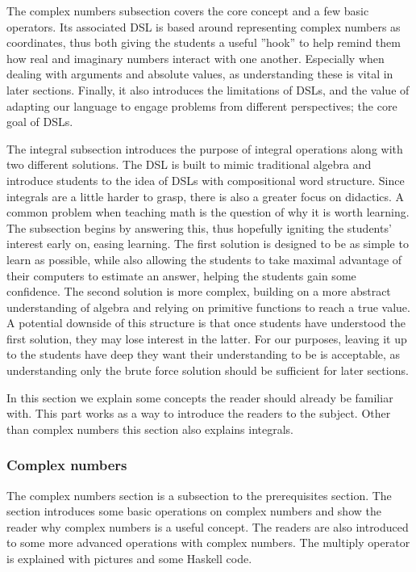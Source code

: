 The complex numbers subsection covers the core concept and a few basic operators. Its associated DSL is based around representing complex numbers as coordinates, thus both giving the students a useful ''hook'' to help remind them how real and imaginary numbers interact with one another. Especially when dealing with arguments and absolute values, as understanding these is vital in later sections. Finally, it also introduces the limitations of DSLs, and the value of adapting our language to engage problems from different perspectives; the core goal of DSLs.

The integral subsection introduces the purpose of integral operations along with two different solutions. The DSL is built to mimic traditional algebra and introduce students to the idea of DSLs with compositional word structure. Since integrals are a little harder to grasp, there is also a greater focus on didactics. A common problem when teaching math is the question of why it is worth learning. The subsection begins by answering this, thus hopefully igniting the students' interest early on, easing learning. The first solution is designed to be as simple to learn as possible, while also allowing the students to take maximal advantage of their computers to estimate an answer, helping the students gain some confidence. The second solution is more complex, building on a more abstract understanding of algebra and relying on primitive functions to reach a true value. A potential downside of this structure is that once students have understood the first solution, they may lose interest in the latter. For our purposes, leaving it up to the students have deep they want their understanding to be is acceptable, as understanding only the brute force solution should be sufficient for later sections.

\iffalse In this section we explain some concepts the reader should already be familiar with. This part works as a way to introduce the readers to the subject. Other than complex numbers this section also explains integrals.

\subsubsection{Complex numbers}
The complex numbers section is a subsection to the prerequisites section. The section introduces some basic operations on complex numbers and show the reader why complex numbers is a useful concept. The readers are also introduced to some more advanced operations with complex numbers. The multiply operator is explained with pictures and some Haskell code.

